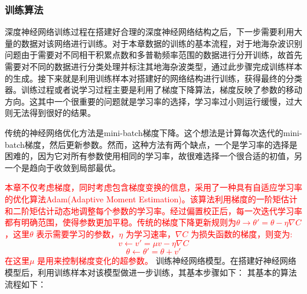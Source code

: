 \subsubsection{训练算法}

深度神经网络训练过程在搭建好合理的深度神经网络结构之后，下一步需要利用大量的数据对该网络进行训练。对于本章数据的训练的基本流程，对于地海杂波识别问题由于需要对不同相干积累点数和多普勒频率范围的数据进行分开训练，故首先需要对不同的数据进行分类处理并标注其地海杂波类型，通过此步骤完成训练样本的生成。接下来就是利用训练样本对搭建好的网络结构进行训练，获得最终的分类器。训练过程或者说学习过程主要是利用了梯度下降算法，梯度反映了参数的移动方向。这其中一个很重要的问题就是学习率的选择，学习率过小则运行缓慢，过大则无法得到很好的结果。

传统的神经网络优化方法是mini-batch梯度下降。这个想法是计算每次迭代的mini-batch梯度，然后更新参数。然而，这种方法有两个缺点，一个是学习率的选择是困难的，因为它对所有参数使用相同的学习率，故很难选择一个很合适的初值，另一个是趋向于收敛到局部最优。

\textcolor{red}{本章不仅考虑梯度，同时考虑包含梯度变换的信息，采用了一种具有自适应学习率的优化算法Adam(Adaptive Moment Estimation)。该算法利用梯度的一阶矩估计和二阶矩估计动态地调整每个参数的学习率。经过偏置校正后，每一次迭代学习率都有明确范围，使得参数更加平稳。传统的梯度下降更新规则为$\theta \rightarrow \theta'=\theta-\eta\nabla C$ ，这里$\theta$ 表示需要学习的参数，$\eta$ 为学习速率，$\nabla C$ 为损失函数的梯度，则变为:
\begin{equation}
	v\leftarrow v'=\mu v - \eta \nabla C
\end{equation}
\begin{equation}
	\theta \leftarrow \theta' = \theta +v'
\end{equation}
在这里$\mu$ 是用来控制梯度变化的超参数。
}
训练神经网络模型。在搭建好神经网络模型后，利用训练样本对该模型做进一步训练，其基本步骤如下：
其基本的算法流程如下：

